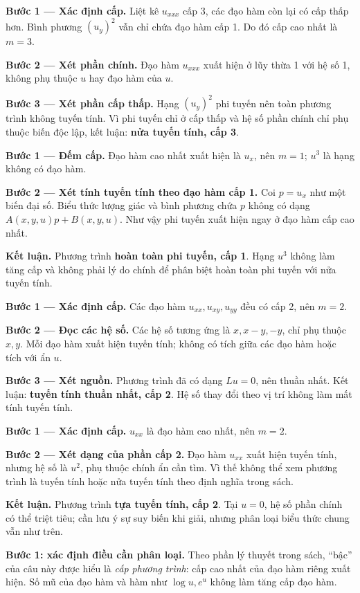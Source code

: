 \textbf{Bước 1 — Xác định cấp.} Liệt kê $u_{xxx}$ cấp 3, các đạo hàm còn lại có cấp thấp hơn. Bình phương $(u_y)^2$ vẫn chỉ chứa đạo hàm cấp 1. Do đó cấp cao nhất là $m=3$.

\textbf{Bước 2 — Xét phần chính.} Đạo hàm $u_{xxx}$ xuất hiện ở lũy thừa 1 với hệ số 1, không phụ thuộc $u$ hay đạo hàm của $u$.

\textbf{Bước 3 — Xét phần cấp thấp.} Hạng $(u_y)^2$ phi tuyến nên toàn phương trình không tuyến tính. Vì phi tuyến chỉ ở cấp thấp và hệ số phần chính chỉ phụ thuộc biến độc lập, kết luận: \textbf{nửa tuyến tính, cấp 3}.

\textbf{Bước 1 — Đếm cấp.} Đạo hàm cao nhất xuất hiện là $u_x$, nên $m=1$; $u^3$ là hạng không có đạo hàm.

\textbf{Bước 2 — Xét tính tuyến tính theo đạo hàm cấp 1.} Coi $p=u_x$ như một biến đại số. Biểu thức lượng giác và bình phương chứa $p$ không có dạng $A(x,y,u)p+B(x,y,u)$. Như vậy phi tuyến xuất hiện ngay ở đạo hàm cấp cao nhất.

\textbf{Kết luận.} Phương trình \textbf{hoàn toàn phi tuyến, cấp 1}. Hạng $u^3$ không làm tăng cấp và không phải lý do chính để phân biệt hoàn toàn phi tuyến với nửa tuyến tính.

\textbf{Bước 1 — Xác định cấp.} Các đạo hàm $u_{xx},u_{xy},u_{yy}$ đều có cấp 2, nên $m=2$.

\textbf{Bước 2 — Đọc các hệ số.} Các hệ số tương ứng là $x,x-y,-y$, chỉ phụ thuộc $x,y$. Mỗi đạo hàm xuất hiện tuyến tính; không có tích giữa các đạo hàm hoặc tích với ẩn $u$.

\textbf{Bước 3 — Xét nguồn.} Phương trình đã có dạng $Lu=0$, nên thuần nhất. Kết luận: \textbf{tuyến tính thuần nhất, cấp 2}. Hệ số thay đổi theo vị trí không làm mất tính tuyến tính.

\textbf{Bước 1 — Xác định cấp.} $u_{xx}$ là đạo hàm cao nhất, nên $m=2$.

\textbf{Bước 2 — Xét dạng của phần cấp 2.} Đạo hàm $u_{xx}$ xuất hiện tuyến tính, nhưng hệ số là $u^2$, phụ thuộc chính ẩn cần tìm. Vì thế không thể xem phương trình là tuyến tính hoặc nửa tuyến tính theo định nghĩa trong sách.

\textbf{Kết luận.} Phương trình \textbf{tựa tuyến tính, cấp 2}. Tại $u=0$, hệ số phần chính có thể triệt tiêu; cần lưu ý sự suy biến khi giải, nhưng phân loại biểu thức chung vẫn như trên.

\textbf{Bước 1: xác định điều cần phân loại.} Theo phần lý thuyết trong sách, ``bậc'' của câu này được hiểu là \emph{cấp phương trình}: cấp cao nhất của đạo hàm riêng xuất hiện. Số mũ của đạo hàm và hàm như $\log u,e^u$ không làm tăng cấp đạo hàm.

